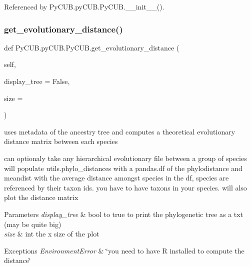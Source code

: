Referenced by Py\+C\+U\+B.\+py\+C\+U\+B.\+Py\+C\+U\+B.\+\_\+\+\_\+init\+\_\+\+\_\+().

\mbox{\label{class_py_c_u_b_1_1py_c_u_b_1_1_py_c_u_b_af0d7bed125f4437bea6b8051f9922c1d}} 
\subsubsection{\texorpdfstring{get\+\_\+evolutionary\+\_\+distance()}{get\_evolutionary\_distance()}}
{\footnotesize\ttfamily def Py\+C\+U\+B.\+py\+C\+U\+B.\+Py\+C\+U\+B.\+get\+\_\+evolutionary\+\_\+distance (\begin{DoxyParamCaption}\item[{}]{self,  }\item[{}]{display\+\_\+tree = {\ttfamily False},  }\item[{}]{size = {} }\end{DoxyParamCaption})}



uses metadata of the ancestry tree and computes a theoretical evolutionary distance matrix between each species 

can optionaly take any hierarchical evolutionary file between a group of species will populate utils.\+phylo\+\_\+distances with a pandas.\+df of the phylodistance and meandist with the average distance amongst species in the df, species are referenced by their taxon ids. you have to have taxons in your species. will also plot the distance matrix


\begin{DoxyParams}{Parameters}
{\em display\+\_\+tree} & bool to true to print the phylogenetic tree as a txt (may be quite big) \\
\hline
{\em size} & int the x size of the plot\\
\hline
\end{DoxyParams}

\begin{DoxyExceptions}{Exceptions}
{\em Environment\+Error} & \char`\"{}you need to have R installed to compute the distance\char`\"{} \\
\hline
\end{DoxyExceptions}


